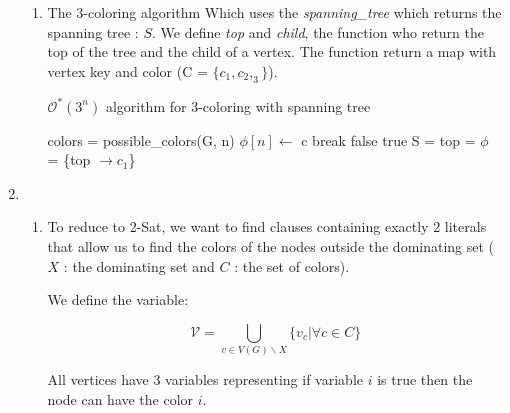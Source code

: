\documentclass{article}
\theoremstyle{plain}
\begin{document}
\begin{enumerate}
\begin{enumerate}
        \item The 3-coloring algorithm Which uses the \textit{spanning\_tree}
          which returns the spanning tree : $S$. We define \textit{top} and
          \textit{child}, the function who return the top of the tree and the
          child of a vertex. The function return a map with vertex key and color
          (C = $\{c_1, c_2, _3\}$).
          \begin{algorithm}
          \caption{$\mathcal O^*(3^n)$ algorithm for 3-coloring with spanning tree}
          \label{tree_color}
          \begin{algorithmic}[1]
              \State colors = possible\_colors(G, n)
                \State $\phi[n] \leftarrow$ c
                  \State break
                \EndIf
                \State \Return false
              \EndFor
            \EndFor
            \State \Return true
            \EndFunction
            \State
            \State S = 
            \State top = 
            \State $\phi$ = \{top $\to c_1$\}
            \State \Return {}
            \EndFunction
          \end{algorithmic}
          \end{algorithm}
      \end{enumerate}

    \newpage
    \item
      \begin{enumerate}
        \item To reduce to 2-Sat, we want to find clauses containing exactly 2
          literals that allow us to find the colors of the nodes outside
          the dominating set ($X$ : the dominating set and $C$ :
          the set of colors).

          We define the variable:

          $$\mathcal V = \bigcup_{v \in V(G) \backslash X} \{v_c  | \forall c
          \in C\}$$

          All vertices have 3 variables representing if variable $i$ is true then
          the node can have the color $i$.


\end{enumerate}
\end{enumerate}
\end{document}
